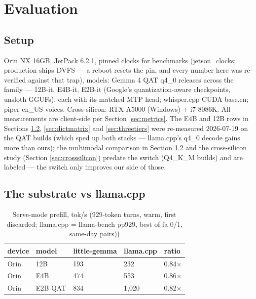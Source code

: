 \documentclass{article}
\begin{document}
\section{Evaluation}
\label{sec:eval}

\subsection{Setup}

Orin NX 16GB, JetPack 6.2.1, pinned clocks for benchmarks (jetson\_clocks; production ships DVFS — a reboot resets the pin, and every number here was re-verified against that trap), models: Gemma 4 QAT q4\_0 releases across the family — 12B-it, E4B-it, E2B-it (Google's quantization-aware checkpoints, unsloth GGUFs), each with its matched MTP head; whisper.cpp CUDA base.en; piper en\_US voices. Cross-silicon: RTX A5000 (Windows) + i7-8086K. All measurements are client-side per Section \ref{sec:metrics}. The E4B and 12B rows in Sections \ref{sec:substrate-eval}, \ref{sec:dictmatrix} and \ref{sec:threetiers} were re-measured 2026-07-19 on the QAT builds (which sped up both stacks — llama.cpp's q4\_0 decode gains more than ours); the multimodal comparison in Section \ref{sec:substrate-eval} and the cross-silicon study (Section \ref{sec:crosssilicon}) predate the switch (Q4\_K\_M builds) and are labeled — the switch only improves our side of those.


\subsection{The substrate vs llama.cpp}
\label{sec:substrate-eval}

\begin{table}[H]
	\centering
	\begin{tabularx}{\textwidth}{l X X X X}
		\toprule
		device & model  & little-gemma  & llama.cpp & ratio \\
		\midrule
		Orin & 12B & 193 & 232 & 0.84×\\
		Orin & E4B & 474 & 553 & 0.86×\\
		Orin & E2B QAT & 834 & 1,020 & 0.82×\\
		\bottomrule
	\end{tabularx}
	\caption{Serve-mode prefill, tok/s (929-token turns, warm, first discarded; llama.cpp = llama-bench pp929, best of fa 0/1, same-day pairs))}
	\label{tab:serve-mode-prefill}
\end{table}
\end{document}
